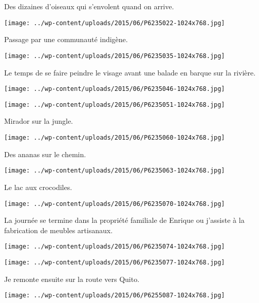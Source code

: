 Des dizaines d'oiseaux qui s'envolent quand on arrive. 
\begin{center} 
\texttt{[image: ../wp-content/uploads/2015/06/P6235022-1024x768.jpg]} 
\end{center}

Passage par une communauté indigène. 
\begin{center} 
\texttt{[image: ../wp-content/uploads/2015/06/P6235035-1024x768.jpg]} 
\end{center}
\pagebreak

Le temps de se faire peindre le visage avant une balade en barque sur la rivière. 
\begin{center} 
\texttt{[image: ../wp-content/uploads/2015/06/P6235046-1024x768.jpg]} 
\end{center}
\begin{center} 
\texttt{[image: ../wp-content/uploads/2015/06/P6235051-1024x768.jpg]} 
\end{center}

\pagebreak
Mirador sur la jungle. 
\begin{center} 
\texttt{[image: ../wp-content/uploads/2015/06/P6235060-1024x768.jpg]} 
\end{center}

Des ananas sur le chemin. 
\begin{center} 
\texttt{[image: ../wp-content/uploads/2015/06/P6235063-1024x768.jpg]} 
\end{center}
\pagebreak

Le lac aux crocodiles. 
\begin{center} 
\texttt{[image: ../wp-content/uploads/2015/06/P6235070-1024x768.jpg]} 
\end{center}

La journée se termine dans la propriété familiale de Enrique ou j'assiste à la fabrication de meubles artisanaux. 
\begin{center} 
\texttt{[image: ../wp-content/uploads/2015/06/P6235074-1024x768.jpg]} 
\end{center}
\begin{center} 
\texttt{[image: ../wp-content/uploads/2015/06/P6235077-1024x768.jpg]} 
\end{center}

Je remonte ensuite sur la route vers Quito. 
\begin{center} 
\texttt{[image: ../wp-content/uploads/2015/06/P6255087-1024x768.jpg]} 
\end{center}
\pagebreak

